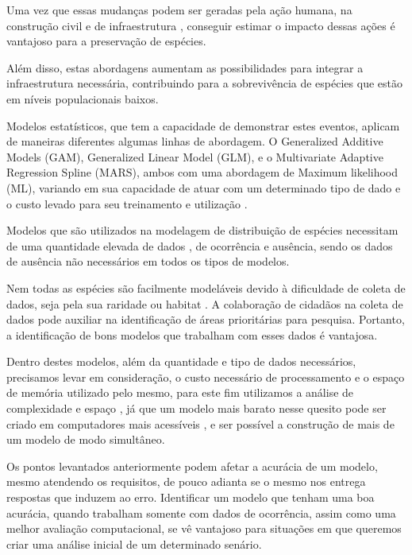 \documentclass[
	12pt,				%
	openright,			%
	oneside,			%
	a4paper,			%
	english,			%
	brazil				%
	]{abntex2}
\begin{document}
Uma vez que essas mudanças podem ser geradas pela ação humana, na construção civil e de infraestrutura 
\cite{impactConstruction}, conseguir estimar o impacto dessas ações é vantajoso para a preservação de espécies.

Além disso, estas abordagens aumentam as possibilidades para integrar a infraestrutura necessária, 
contribuindo para a sobrevivência de espécies que estão em níveis populacionais baixos.

Modelos estatísticos, que tem a capacidade de demonstrar estes eventos, aplicam de maneiras diferentes algumas 
linhas de abordagem. O Generalized Additive Models (GAM), Generalized Linear Model (GLM), e o 
Multivariate Adaptive Regression Spline (MARS), ambos com uma abordagem de Maximum likelihood (ML), 
variando em sua capacidade de atuar com um determinado tipo de dado e o custo levado para seu treinamento 
e utilização \cite{predPerform33models}.

Modelos que são utilizados na modelagem de distribuição de espécies necessitam de uma quantidade elevada de dados 
\cite{sampleSize}, de ocorrência e ausência, sendo os dados de ausência não necessários em todos os tipos de modelos.

Nem todas as espécies são facilmente modeláveis devido à dificuldade de coleta de dados, seja pela sua raridade ou habitat 
\cite{especiesDificies}. A colaboração de cidadãos na coleta de dados pode auxiliar na identificação de áreas prioritárias 
para pesquisa. Portanto, a identificação de bons modelos que trabalham com esses dados é vantajosa.

Dentro destes modelos, além da quantidade e tipo de dados necessários, precisamos levar em consideração, o custo necessário de 
processamento e o espaço de memória utilizado pelo mesmo, para este fim utilizamos a análise de complexidade 
e espaço \cite{introductionAlgorthms}, já que um modelo mais barato nesse quesito pode ser criado em computadores 
mais acessíveis \cite{introductionAnalysis}, e ser possível a construção de mais de um modelo de modo simultâneo.

Os pontos levantados anteriormente podem afetar a acurácia de um modelo, mesmo atendendo os requisitos, 
de pouco adianta se o mesmo nos entrega respostas que induzem ao erro. Identificar um modelo que tenham uma boa acurácia, 
quando trabalham somente com dados de ocorrência, assim como uma melhor avaliação computacional, se vê vantajoso para 
situações em que queremos criar uma análise inicial de um determinado senário.
\end{document}
